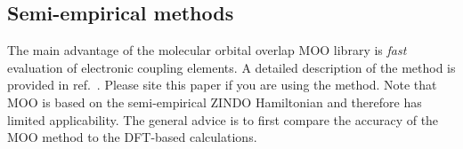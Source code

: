 \subsection{Semi-empirical methods}
\label{sec:moo}

\newcommand{\moo}{MOO\xspace}

The main advantage of the molecular orbital overlap \moo library is {\em fast} evaluation of electronic coupling elements. A detailed description of the method is provided in ref.~\cite{kirkpatrick_approximate_2008}. Please site this paper if you are using the method. Note that \moo is based on the semi-empirical ZINDO Hamiltonian and therefore has limited applicability. The general advice is to first compare the accuracy of the \moo method to the DFT-based calculations. 

